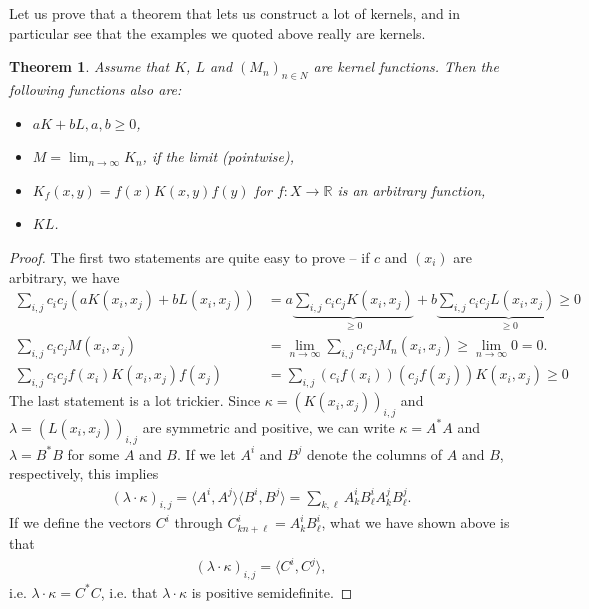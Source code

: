 \documentclass{article}
\newcommand{\sprod}[1]{\langle #1 \rangle}
\newcommand{\R}{\mathbb{R}}
\newtheorem{theorem}{Theorem}
\begin{document}
Let us prove that a theorem that lets us construct a lot of kernels, and in particular see that the examples we quoted above really are kernels.
\begin{theorem}
    Assume that $K$, $L$ and $(M_n)_{n\in N}$ are kernel functions. Then the following functions also are:
    \begin{itemize}
        \item $aK + bL, a,b\geq 0$,
        \item $M=\lim_{n\to \infty}K_n$, if the limit (pointwise),
        \item $K_f(x,y)=f(x)K(x,y)f(y)$ for $f : X\to \R$ is an arbitrary function,
        \item $KL$.
    \end{itemize}
\end{theorem}
\begin{proof}
    The first two statements are quite easy to prove -- if $c$ and $(x_i)$ are arbitrary, we have
    \begin{align*}
        \sum_{i,j} c_ic_j (aK(x_i,x_j)+bL(x_i,x_j)) &=  a\underbrace{\sum_{i,j} c_ic_j K(x_i,x_j)}_{\geq 0}+b\underbrace{\sum_{i,j} c_ic_j L (x_i,x_j) \geq 0}_{\geq 0} \\
         \sum_{i,j} c_ic_j M(x_i,x_j) &= \lim_{n\to \infty }  \sum_{i,j} c_ic_j M_n(x_i,x_j) \geq \lim_{n\to \infty} 0 = 0. \\
         \sum_{i,j} c_ic_j f(x_i)K(x_i,x_j)f(x_j) &= \sum_{i,j}(c_if(x_i))(c_jf(x_j))K(x_i,x_j) \geq 0 
    \end{align*}
    The last statement is a lot trickier. Since $\kappa =(K(x_i,x_j))_{i,j}$ and $\lambda =(L(x_i,x_j))_{i,j}$ are symmetric and positive, we can write $\kappa = A^*A$ and $\lambda = B^*B$ for some $A$ and $B$. If we let $A^i$ and $B^j$ denote the columns of $A$ and $B$, respectively, this implies
    \begin{align*}
        (\lambda \cdot \kappa)_{i,j} = \sprod{A^i,A^j}\sprod{B^i,B^j} =  \sum_{k,\ell} A^i_kB^i_\ell A^j_kB^j_\ell.
    \end{align*}
    If we define the vectors $C^i$ through $C^i_{kn+\ell}=A^i_kB^i_\ell$, what we have shown above is that 
    \begin{align*}
        (\lambda \cdot \kappa)_{i,j} = \sprod{C^i,C^j},
    \end{align*}
    i.e. $\lambda \cdot \kappa = C^*C$, i.e. that $\lambda \cdot \kappa$ is positive semidefinite.


\end{proof}
\end{document}
